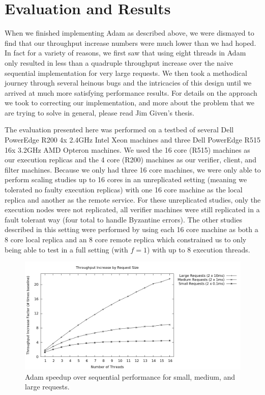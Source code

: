 \documentclass[11pt, oneside]{report}
\begin{document}
\chapter{Evaluation and Results}\label{AdamResults}

When we finished implementing Adam as described above, we were dismayed to find that our throughput increase numbers were much lower than we had hoped. 
In fact for a variety of reasons, we first saw that using eight threads in Adam only resulted in less than a quadruple throughput increase over the naive sequential implementation for very large requests. 
We then took a methodical journey through several heinous bugs and the intricacies of this design until we arrived at much more satisfying performance results. 
For details on the approach we took to correcting our implementation, and more about the problem that we are trying to solve in general, please read Jim Given's thesis.

The evaluation presented here was performed on a testbed of several Dell PowerEdge R200 4x 2.4GHz Intel Xeon machines and three Dell PowerEdge R515 16x 3.2GHz AMD Opteron machines. 
We used the 16 core (R515) machines as our execution replicas and the 4 core (R200) machines as our verifier, client, and filter machines. 
Because we only had three 16 core machines, we were only able to perform scaling studies up to 16 cores in an unreplicated setting (meaning we tolerated no faulty execution replicas) with one 16 core machine as the local replica and another as the remote service. 
For these unreplicated studies, only the execution nodes were not replicated, all verifier machines were still replicated in a fault tolerant way (four total to handle Byzantine errors).
The other studies described in this setting were performed by using each 16 core machine as both a 8 core local replica and an 8 core remote replica which constrained us to only being able to test in a full setting (with $f = 1$) with up to 8 execution threads.

\begin{figure}[h]
\centering
\includegraphics[width=1.0\textwidth]{graphs/requestweights/graph.png}
\caption{\label{scaling}Adam speedup over sequential performance for small, medium, and large requests.}
\end{figure}
\end{document}

